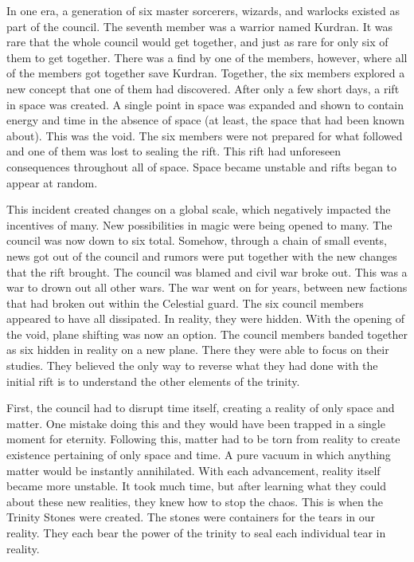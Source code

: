 In one era, a generation of six master sorcerers, wizards, and warlocks existed as part of the council. The seventh member was a warrior named Kurdran. It was rare that the whole council would get together, and just as rare for only six of them to get together. There was a find by one of the members, however, where all of the members got together save Kurdran. Together, the six members explored a new concept that one of them had discovered. After only a few short days, a rift in space was created. A single point in space was expanded and shown to contain energy and time in the absence of space (at least, the space that had been known about). This was the void. The six members were not prepared for what followed and one of them was lost to sealing the rift. This rift had unforeseen consequences throughout all of space. Space became unstable and rifts began to appear at random.

This incident created changes on a global scale, which negatively impacted the incentives of many. New possibilities in magic were being opened to many. The council was now down to six total. Somehow, through a chain of small events, news got out of the council and rumors were put together with the new changes that the rift brought. The council was blamed and civil war broke out. This was a war to drown out all other wars. The war went on for years, between new factions that had broken out within the Celestial guard. The six council members appeared to have all dissipated. In reality, they were hidden. With the opening of the void, plane shifting was now an option. The council members banded together as six hidden in reality on a new plane. There they were able to focus on their studies. They believed the only way to reverse what they had done with the initial rift is to understand the other elements of the trinity. 

First, the council had to disrupt time itself, creating a reality of only space and matter. One mistake doing this and they would have been trapped in a single moment for eternity. Following this, matter had to be torn from reality to 
create existence pertaining of only space and time. A pure vacuum in which anything matter would be instantly annihilated. With each advancement, reality itself became more unstable. It took much time, but after learning what they could about these new realities, they knew how to stop the chaos. This is when the Trinity Stones were created. The stones were containers for the tears in our reality. They each bear the power of the trinity to seal each individual tear in reality.

